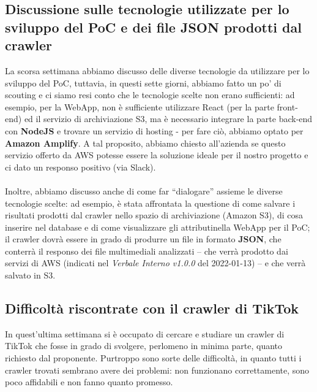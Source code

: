 \subsection{Discussione sulle tecnologie utilizzate per lo sviluppo del PoC e dei file JSON prodotti dal crawler}

La scorsa settimana abbiamo discusso delle diverse tecnologie da utilizzare per lo sviluppo del PoC, tuttavia, in questi sette giorni, abbiamo fatto un po' di scouting e ci siamo resi conto che le tecnologie scelte non erano sufficienti: ad esempio, per la WebApp, non è sufficiente utilizzare React (per la parte front-end) ed il servizio di archiviazione S3, ma è necessario integrare la parte back-end con \textbf{NodeJS} e trovare un servizio di hosting - per fare ciò, abbiamo optato per \textbf{Amazon Amplify}. A tal proposito, abbiamo chiesto all'azienda se questo servizio offerto da AWS potesse essere la soluzione ideale per il nostro progetto e ci dato un responso positivo (via Slack).
\\ \\
Inoltre, abbiamo discusso anche di come far “dialogare” assieme le diverse tecnologie scelte: ad esempio, è stata affrontata la questione di come salvare i risultati prodotti dal crawler nello spazio di archiviazione (Amazon S3), di cosa inserire nel database e di come visualizzare gli attributi\glo nella WebApp per il PoC; il crawler dovrà essere in grado di produrre un file in formato \textbf{JSON}, che conterrà il responso dei file multimediali analizzati – che verrà prodotto dai servizi di AWS (indicati nel \textit{Verbale Interno v1.0.0} del 2022-01-13) – e che verrà salvato in S3.  

\subsection{Difficoltà riscontrate con il crawler di TikTok}

In quest'ultima settimana \MG{} si è occupato di cercare e studiare un crawler di TikTok che fosse in grado di svolgere, perlomeno in minima parte, quanto richiesto dal proponente. Purtroppo sono sorte delle difficoltà, in quanto tutti i crawler trovati sembrano avere dei problemi: non funzionano correttamente, sono poco affidabili e non fanno quanto promesso. 

